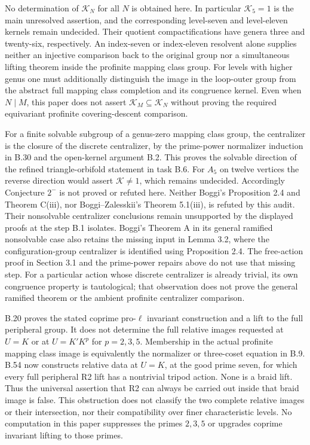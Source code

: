 No determination of $\mathcal K_N$ for all $N$ is obtained here.
In particular $\mathcal K_5=1$ is the main unresolved assertion,
and the corresponding level-seven and level-eleven kernels
remain undecided. Their quotient compactifications have genera
three and twenty-six, respectively. An index-seven or
index-eleven resolvent alone supplies neither an injective
comparison back to the original group nor a simultaneous
lifting theorem inside the profinite mapping class group.
For levels with higher genus one must additionally distinguish
the image in the loop-outer group from the abstract full
mapping class completion and its congruence kernel.
Even when $N\mid M$, this paper does not assert
$\mathcal K_M\subseteq\mathcal K_N$ without proving the
required equivariant profinite covering-descent comparison.

For a finite solvable subgroup of a genus-zero mapping class
group, the centralizer is the closure of the discrete centralizer,
by the prime-power normalizer induction in B.30 and the
open-kernel argument B.2. This proves the solvable direction
of the refined triangle-orbifold statement in task B.6.
For $A_5$ on twelve vertices the reverse direction would
assert $\mathcal K\ne1$, which remains undecided.
Accordingly Conjecture $2^-$ is not proved or refuted here.
Neither Boggi's Proposition 2.4 and Theorem C(iii), nor
Boggi--Zalesskii's Theorem 5.1(iii), is refuted by this audit.
Their nonsolvable centralizer conclusions remain unsupported
by the displayed proofs at the step B.1 isolates.
Boggi's Theorem A in its general ramified nonsolvable case
also retains the missing input in Lemma 3.2, where the
configuration-group centralizer is identified using
Proposition 2.4. The free-action proof in Section 3.1 and
the prime-power repairs above do not use that missing step.
For a particular action whose discrete centralizer is already
trivial, its own congruence property is tautological; that
observation does not prove the general ramified theorem or
the ambient profinite centralizer comparison.

B.20 proves the stated coprime pro-$\ell$ invariant construction
and a lift to the full peripheral group. It does not determine
the full relative images requested at $U=K$ or at
$U=K'K^p$ for $p=2,3,5$. Membership in the actual profinite
mapping class image is equivalently the normalizer or
three-coset equation in B.9. B.54 now constructs relative
data at $U=K$, at the good prime seven, for which every
full peripheral R2 lift has a nontrivial tripod action.
None is a braid lift. Thus the universal assertion that
R2 can always be carried out inside that braid image is
false. This obstruction does not classify the two complete
relative images or their intersection, nor their
compatibility over finer characteristic levels.
No computation in this paper suppresses the primes
$2,3,5$ or upgrades coprime invariant lifting to those primes.

